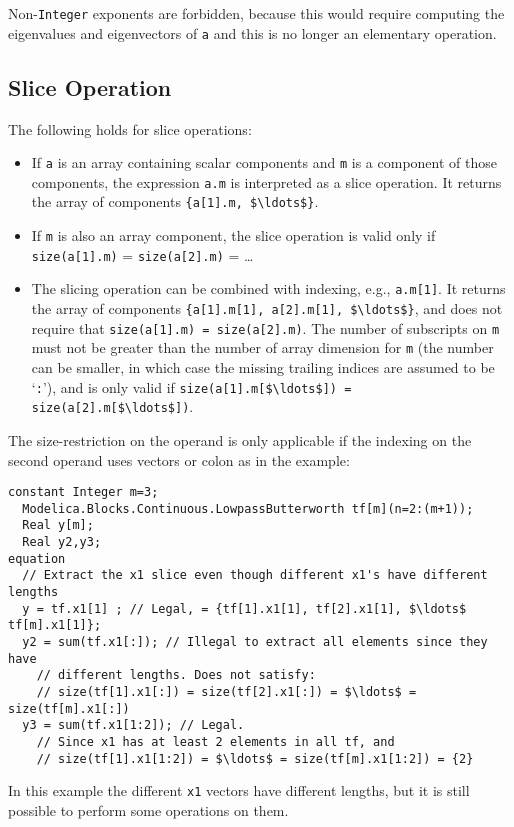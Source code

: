 \begin{nonnormative}
Non-\lstinline!Integer! exponents are forbidden, because this would require
computing the eigenvalues and eigenvectors of \lstinline!a! and this is no
longer an elementary operation.
\end{nonnormative}

\subsection{Slice Operation}\label{slice-operation}

The following holds for slice operations:
\begin{itemize}
\item
  If \lstinline!a! is an array containing scalar components and \lstinline!m! is a component of those components, the expression \lstinline!a.m! is interpreted as a
  slice operation.  It returns the array of components \lstinline!{a[1].m, $\ldots$}!.
\item
  If \lstinline!m! is also an array component, the slice operation is valid only if \lstinline!size(a[1].m)! = \lstinline!size(a[2].m)! = \ldots
\item
  The slicing operation can be combined with indexing, e.g., \lstinline!a.m[1]!.  It returns the array of components \lstinline!{a[1].m[1], a[2].m[1], $\ldots$}!,
  and does not require that \lstinline!size(a[1].m) = size(a[2].m)!.  The number of subscripts on \lstinline!m! must not be greater than the number of array dimension
  for \lstinline!m! (the number can be smaller, in which case the missing trailing indices are assumed to be `\lstinline!:!'), and is only valid if
  \lstinline!size(a[1].m[$\ldots$]) = size(a[2].m[$\ldots$])!.
\end{itemize}

\begin{example}
The size-restriction on the operand is only applicable if the indexing on the second operand uses vectors or colon as in the example:
\begin{lstlisting}[language=modelica]
  constant Integer m=3;
  Modelica.Blocks.Continuous.LowpassButterworth tf[m](n=2:(m+1));
  Real y[m];
  Real y2,y3;
equation
  // Extract the x1 slice even though different x1's have different lengths
  y = tf.x1[1] ; // Legal, = {tf[1].x1[1], tf[2].x1[1], $\ldots$ tf[m].x1[1]};
  y2 = sum(tf.x1[:]); // Illegal to extract all elements since they have
    // different lengths. Does not satisfy:
    // size(tf[1].x1[:]) = size(tf[2].x1[:]) = $\ldots$ = size(tf[m].x1[:])
  y3 = sum(tf.x1[1:2]); // Legal.
    // Since x1 has at least 2 elements in all tf, and
    // size(tf[1].x1[1:2]) = $\ldots$ = size(tf[m].x1[1:2]) = {2}
\end{lstlisting}
In this example the different \lstinline!x1! vectors have different lengths,
but it is still possible to perform some operations on them.
\end{example}


